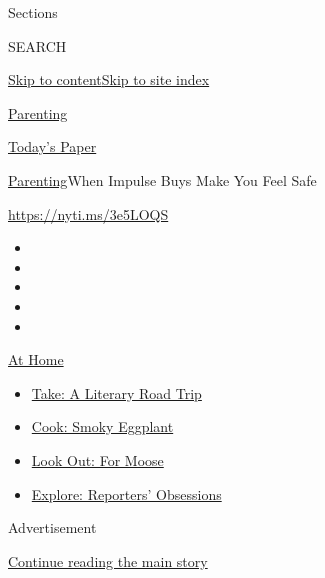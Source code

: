 Sections

SEARCH

\protect\hyperlink{site-content}{Skip to
content}\protect\hyperlink{site-index}{Skip to site index}

\href{https://www.nytimes.com/section/parenting}{Parenting}

\href{https://myaccount.nytimes.com/auth/login?response_type=cookie\&client_id=vi}{}

\href{https://www.nytimes.com/section/todayspaper}{Today's Paper}

\href{/section/parenting}{Parenting}\textbar{}When Impulse Buys Make You
Feel Safe

\url{https://nyti.ms/3e5LOQS}

\begin{itemize}
\item
\item
\item
\item
\item
\end{itemize}

\href{https://www.nytimes.com/spotlight/at-home?action=click\&pgtype=Article\&state=default\&region=TOP_BANNER\&context=at_home_menu}{At
Home}

\begin{itemize}
\tightlist
\item
  \href{https://www.nytimes.com/2020/07/28/books/time-for-a-literary-road-trip.html?action=click\&pgtype=Article\&state=default\&region=TOP_BANNER\&context=at_home_menu}{Take:
  A Literary Road Trip}
\item
  \href{https://www.nytimes.com/2020/07/29/magazine/bored-with-your-home-cooking-some-smoky-eggplant-will-fix-that.html?action=click\&pgtype=Article\&state=default\&region=TOP_BANNER\&context=at_home_menu}{Cook:
  Smoky Eggplant}
\item
  \href{https://www.nytimes.com/2020/07/27/travel/moose-michigan-isle-royale.html?action=click\&pgtype=Article\&state=default\&region=TOP_BANNER\&context=at_home_menu}{Look
  Out: For Moose}
\item
  \href{https://www.nytimes.com/interactive/2020/at-home/even-more-reporters-editors-diaries-lists-recommendations.html?action=click\&pgtype=Article\&state=default\&region=TOP_BANNER\&context=at_home_menu}{Explore:
  Reporters' Obsessions}
\end{itemize}

Advertisement

\protect\hyperlink{after-top}{Continue reading the main story}

